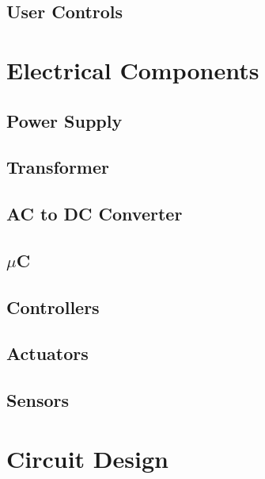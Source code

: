 \documentclass[titlepage]{article}
\begin{document}
\subsection{User Controls}%



\section{Electrical Components}
\subsection{Power Supply}
\subsection{Transformer}
\subsection{AC to DC Converter}
\subsection{$\mu$C}
\subsection{Controllers}
\subsection{Actuators}
\subsection{Sensors}



\section{Circuit Design}


\end{document}
